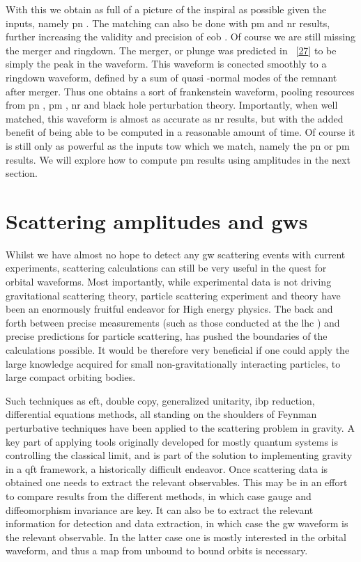 \documentclass[
  10pt,
  a4paper,
  DIV=11,
  numbers=noendperiod,
  twoside]{scrreprt}
\DeclareRobustCommand{\[}{\begin{equation}}
\DeclareRobustCommand{\]}{\end{equation}}
\begin{document}
With this we obtain as full of a picture of the inspiral as possible
given the inputs, namely \gls{pn} . The matching can also be done with
\gls{pm} and \gls{nr} results, further increasing the validity and
precision of \gls{eob} . Of course we are still missing the merger and
ringdown. The merger, or plunge was predicted in
~{[}\protect\hyperlink{ref-Buonanno:2000ef}{27}{]} to be simply the peak
in the waveform. This waveform is conected smoothly to a ringdown
waveform, defined by a sum of quasi -normal modes of the remnant after
merger. Thus one obtains a sort of frankenstein waveform, pooling
resources from \gls{pn} , \gls{pm} , \gls{nr} and black hole
perturbation theory. Importantly, when well matched, this waveform is
almost as accurate as \gls{nr} results, but with the added benefit of
being able to be computed in a reasonable amount of time. Of course it
is still only as powerful as the inputs tow which we match, namely the
\gls{pn} or \gls{pm} results. We will explore how to compute \gls{pm}
results using amplitudes in the next section.


\hypertarget{sec-scat}{%
\chapter{\texorpdfstring{Scattering amplitudes and
\gls{gw}s}{Scattering amplitudes and }}\label{sec-scat}}

Whilst we have almost no hope to detect any \gls{gw} scattering events
with current experiments, scattering calculations can still be very
useful in the quest for orbital waveforms. Most importantly, while
experimental data is not driving gravitational scattering theory,
particle scattering experiment and theory have been an enormously
fruitful endeavor for High energy physics. The back and forth between
precise measurements (such as those conducted at the \gls{lhc} ) and
precise predictions for particle scattering, has pushed the boundaries
of the calculations possible. It would be therefore very beneficial if
one could apply the large knowledge acquired for small
non-gravitationally interacting particles, to large compact orbiting
bodies.

Such techniques as \gls{eft}, double copy, generalized unitarity,
\gls{ibp} reduction, differential equations methods, all standing on the
shoulders of Feynman perturbative techniques have been applied to the
scattering problem in gravity. A key part of applying tools originally
developed for mostly quantum systems is controlling the classical limit,
and is part of the solution to implementing gravity in a \gls{qft}
framework, a historically difficult endeavor. Once scattering data is
obtained one needs to extract the relevant observables. This may be in
an effort to compare results from the different methods, in which case
gauge and diffeomorphism invariance are key. It can also be to extract
the relevant information for detection and data extraction, in which
case the \gls{gw} waveform is the relevant observable. In the latter
case one is mostly interested in the orbital waveform, and thus a map
from unbound to bound orbits is necessary.
\end{document}
